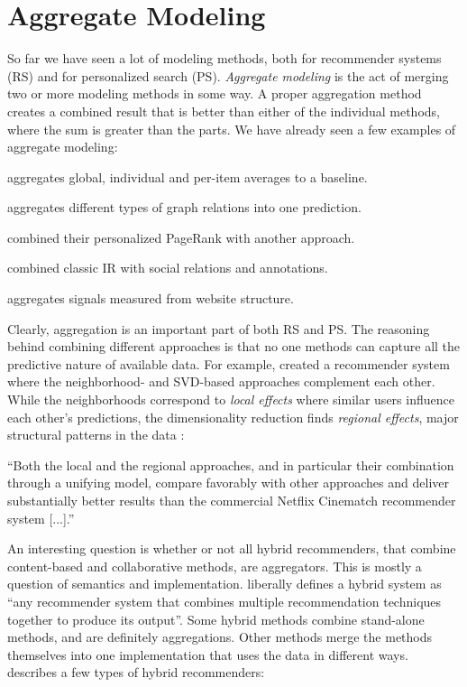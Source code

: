 \section{Aggregate Modeling}
\label{sec:aggregate}

So far we have seen a lot of modeling methods, both for recommender systems (RS) and for personalized search (PS).
\emph{Aggregate modeling} is the act of merging two or more modeling methods in some way.
A proper aggregation method creates a combined result that is better than either of the individual methods,
where the sum is greater than the parts.
We have already seen a few examples of aggregate modeling:

\begin{itemize*}
  \item \cite{Koren2008} aggregates global, individual and per-item averages to a baseline.
  \item \cite{Huang2002} aggregates different types of graph relations into one prediction.
  \item \citet{Haveliwala2003} combined their personalized PageRank with another approach.
  \item \cite{Carmel2009} combined classic IR with social relations and annotations.
  \item \citet[p5]{Bender2005} aggregates signals measured from website structure.
\end{itemize*}

Clearly, aggregation is an important part of both RS and PS.
The reasoning behind combining different approaches is that no one methods
can capture all the predictive nature of available data.
For example, 
\cite{Bell2007b} created a recommender system where the neighborhood- and SVD-based approaches complement each other.
While the neighborhoods correspond to \emph{local effects} where similar users influence each other's predictions,
the dimensionality reduction finds \emph{regional effects}, major structural patterns in the data \citep{Bell2007b}:

\begin{blockquote}
``Both the local and the regional approaches, and in particular their combination through a unifying model, 
compare favorably with other approaches and deliver substantially better results than the 
commercial Netflix Cinematch recommender system [...].''
\end{blockquote}

An interesting question is whether or not all hybrid recommenders,
that combine content-based and collaborative methods, are aggregators. 
This is mostly a question of semantics and implementation.
\citet[p4]{Burke2007} liberally defines a hybrid system as 
``any recommender system that combines multiple recommendation techniques together to produce its output''.
Some hybrid methods combine stand-alone methods, and are definitely aggregations.
Other methods merge the methods themselves into one implementation that uses the data in different ways.
\citeauthor{Burke2007} describes a few types of hybrid recommenders:

